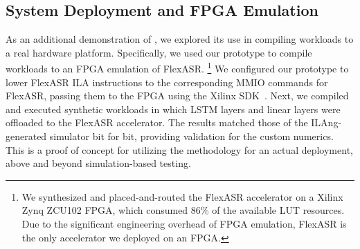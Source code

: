 \subsection{System Deployment and FPGA Emulation}
\label{sec.eval-fpga}

As an additional demonstration of {\TLA}, we explored its use in 
  compiling workloads
  to a real hardware platform.
  Specifically, 
  we used our prototype to compile workloads
  to an FPGA emulation of FlexASR.%
\footnote{We synthesized and placed-and-routed the FlexASR accelerator on a Xilinx Zynq ZCU102 FPGA, which consumed 86\% of the available LUT resources.
Due to the significant engineering overhead of FPGA emulation, FlexASR is the only accelerator we deployed on an FPGA.}
%
We configured our prototype to lower
 FlexASR ILA instructions
 to the corresponding MMIO commands for FlexASR, %
 passing them to the FPGA using the Xilinx SDK~\cite{xsdk}.
%
Next, we compiled and executed synthetic workloads in which LSTM layers and linear layers were offloaded to the FlexASR accelerator.
The results matched those of the ILAng-generated simulator bit for bit, providing validation for %
the custom numerics.
This is a proof of concept for utilizing the {\TLA} methodology for an actual deployment, above and beyond simulation-based testing.
%
